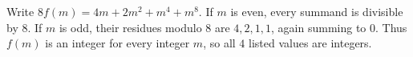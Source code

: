 Write $8f(m)=4m+2m^2+m^4+m^8$. If $m$ is even, every summand is divisible by $8$. If $m$ is odd, their residues modulo $8$ are $4,2,1,1$, again summing to $0$. Thus $f(m)$ is an integer for every integer $m$, so all $\boxed4$ listed values are integers.
